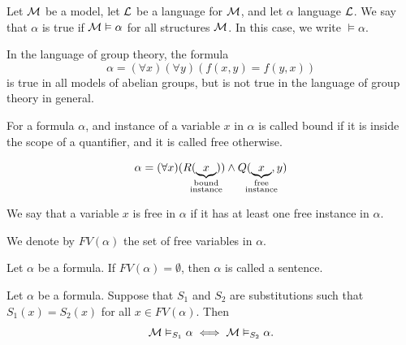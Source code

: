 \documentclass[11pt,a4paper]{article}
\DeclareRobustCommand{\models}{%
  \mathrel{\vDash}%
}
\begin{document}
\begin{definition}
  Let $\mathcal{M}$ be a model, let $\mathcal{L}$ be a language for $\mathcal{M}$, 
  and let $\alpha$ language $\mathcal{L}$.
  We say that $\alpha$ is true if $\M \models \alpha$ for all
  structures $\mathcal{M}$.
  In this case, we write $\models \alpha$.
\end{definition}

\begin{example}
  In the language of group theory, the formula
  \[
    \alpha = (\forall x)(\forall y)(f(x,y) = f(y,x))
  \]
  is true in all models of abelian groups, but is not true in the language
  of group theory in general.
\end{example}

\begin{definition}
  For a formula $\alpha$, and instance of a variable $x$ in $\alpha$
  is called bound if it is inside the scope of a quantifier, and it is called
  free otherwise.
\end{definition}

\begin{example}
  \[
    \alpha = (\forall x)(R(\underbrace{x}_{\mathclap{
    \substack{\text{bound} \\ \text{instance}}}})) 
    \land Q(\underbrace{x}_{\mathclap{
    \substack{\text{free} \\ \text{instance}}}},y)
  \]
\end{example}

\begin{definition}
  We say that a variable $x$ is free in $\alpha$ if it has at least one 
  free instance in $\alpha$.
\end{definition}
\begin{remark}
  We denote by $FV(\alpha)$ the set of free variables in $\alpha$.
\end{remark}

\begin{definition}[Sentence]
  Let $\alpha$ be a formula.
  If $FV(\alpha) = \emptyset$, then $\alpha$ is called a sentence.
\end{definition}

\begin{proposition}
  Let $\alpha$ be a formula.
  Suppose that $S_1$ and $S_2$ are substitutions such that $S_1(x) = S_2(x)$
  for all $x \in FV(\alpha)$.
  Then
  \[
    \M \models_{S_1} \alpha \iff
    \M \models_{S_2} \alpha.
  \]
\end{proposition}
\end{document}
